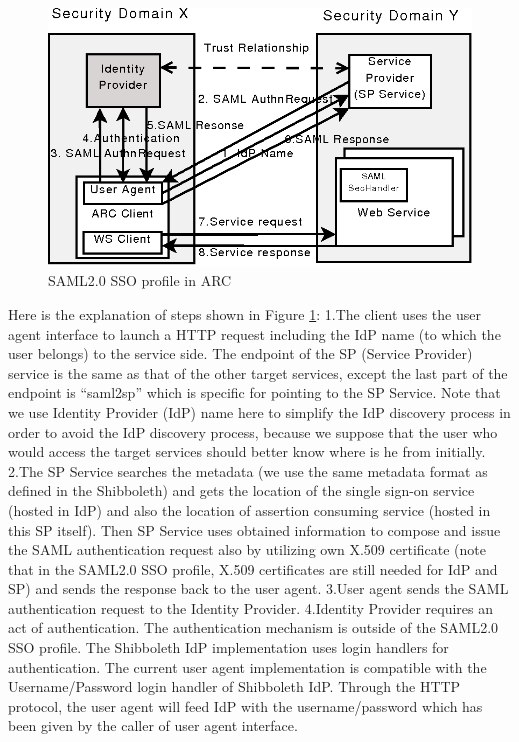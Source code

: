 \documentclass[twocolumn]{svjour3}         %
\begin{document}
\begin{figure}
\includegraphics[width=0.9\columnwidth]{SAML2SSO.png}
\caption{SAML2.0 SSO profile in ARC}
\label{fig:SAML2SSO}
\end{figure}
Here is the explanation of steps shown in Figure \ref{fig:SAML2SSO}:
1.The client uses the user agent interface to launch a HTTP request including the IdP name (to which the user belongs) to the service side. The endpoint of the SP (Service Provider) service is the same as that of the other target services, except the last part of the endpoint is “saml2sp” which is specific for pointing to the SP Service. Note that we use Identity Provider (IdP) name here to simplify the IdP discovery process in order to avoid the IdP discovery process, because we suppose that the user who would access the target services should better know where is he from initially.
2.The SP Service searches the metadata (we use the same metadata format as defined in the Shibboleth) and gets the location of the single sign-on service (hosted in IdP) and also the location of assertion consuming service (hosted in this SP itself). Then SP Service uses obtained information to compose and issue the SAML authentication request also by utilizing own X.509 certificate (note that in the SAML2.0 SSO profile, X.509 certificates are still needed for IdP and SP) and sends the response back to the user agent.
3.User agent sends the SAML authentication request to the Identity Provider.
4.Identity Provider requires an act of authentication. The authentication mechanism is outside of the SAML2.0 SSO profile. The Shibboleth IdP implementation uses login handlers for authentication. The current user agent implementation is compatible with the Username/Password login handler of Shibboleth IdP. Through the HTTP protocol, the user agent will feed IdP with the username/password which has been given by the caller of user agent interface.
\end{document}
